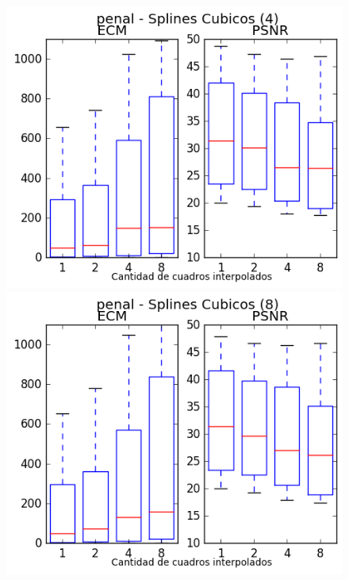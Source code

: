 \begin{figure}[H]
\centering
\begin{minipage}{0.33\textwidth}   
    \includegraphics[width=1\textwidth]{imgs/resultados_error/penal_2.png} 
\end{minipage}\hfill
\begin{minipage}{0.33\textwidth}   
    \includegraphics[width=1\textwidth]{imgs/resultados_error/penal_3.png} 
\end{minipage}\hfill
\begin{minipage}{0.33\textwidth}   

\end{minipage}
\end{figure}
